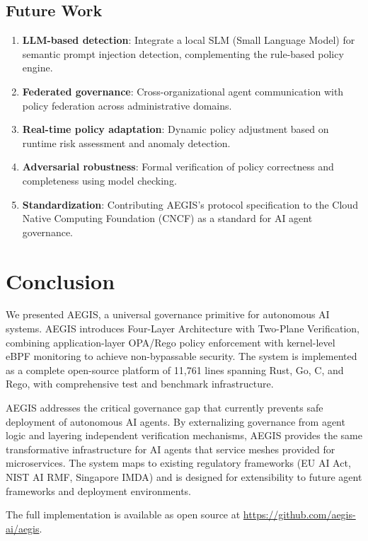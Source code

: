\documentclass[runningheads]{llncs}
\begin{document}
\subsection{Future Work}

\begin{enumerate}
\item \textbf{LLM-based detection}: Integrate a local SLM (Small Language Model) for semantic prompt injection detection, complementing the rule-based policy engine.
\item \textbf{Federated governance}: Cross-organizational agent communication with policy federation across administrative domains.
\item \textbf{Real-time policy adaptation}: Dynamic policy adjustment based on runtime risk assessment and anomaly detection.
\item \textbf{Adversarial robustness}: Formal verification of policy correctness and completeness using model checking.
\item \textbf{Standardization}: Contributing AEGIS's protocol specification to the Cloud Native Computing Foundation (CNCF) as a standard for AI agent governance.
\end{enumerate}

\section{Conclusion}

We presented AEGIS, a universal governance primitive for autonomous AI systems. AEGIS introduces Four-Layer Architecture with Two-Plane Verification, combining application-layer OPA/Rego policy enforcement with kernel-level eBPF monitoring to achieve non-bypassable security. The system is implemented as a complete open-source platform of 11,761 lines spanning Rust, Go, C, and Rego, with comprehensive test and benchmark infrastructure.

AEGIS addresses the critical governance gap that currently prevents safe deployment of autonomous AI agents. By externalizing governance from agent logic and layering independent verification mechanisms, AEGIS provides the same transformative infrastructure for AI agents that service meshes provided for microservices. The system maps to existing regulatory frameworks (EU AI Act, NIST AI RMF, Singapore IMDA) and is designed for extensibility to future agent frameworks and deployment environments.

The full implementation is available as open source at \url{https://github.com/aegis-ai/aegis}.
\end{document}
